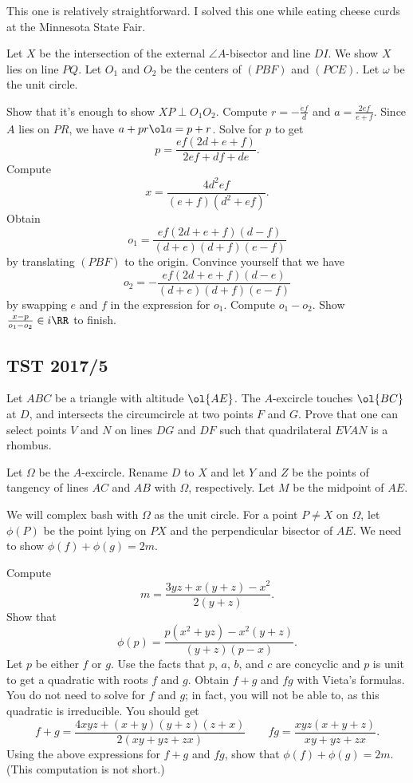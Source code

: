 \documentclass[11pt]{scrartcl}
\begin{document}
\begin{walkthrough}
	This one is relatively straightforward. I solved this one while eating cheese curds at the Minnesota State Fair.

	Let $X$ be the intersection of the external $\angle A$-bisector and line $DI$. We show $X$ lies on line $PQ$. Let $O_1$ and $O_2$ be the centers of $(PBF)$ and $(PCE)$. Let $\omega$ be the unit circle.
	\begin{walk}
		\ii Show that it's enough to show $XP \perp O_1O_2$.
		\ii Compute $r = -\frac{ef}d$ and $a = \frac{2ef}{e + f}$. Since $A$ lies on $PR$, we have $a + pr\ol a = p + r$. Solve for $p$ to get
		\[p = \frac{ef(2d + e + f)}{2ef + df + de}.\]
		\ii Compute
		\[x = \frac{4d^2ef}{(e + f)(d^2 + ef)}.\]
		\ii Obtain
		\[o_1 = \frac{ef(2d + e + f)(d - f)}{(d + e)(d + f)(e - f)}\]
		by translating $(PBF)$ to the origin.
		\ii Convince yourself that we have
		\[o_2 = -\frac{ef(2d + e + f)(d - e)}{(d + e)(d + f)(e - f)}\]
		by swapping $e$ and $f$ in the expression for $o_1$. Compute $o_1 - o_2$.
		\ii Show $\frac{x - p}{o_1 - o_2} \in i\RR$ to finish.
	\end{walk}
\end{walkthrough}

\pagebreak

\subsection{TST 2017/5}

\begin{example}[TST 2017/5]
	Let $ABC$ be a triangle with altitude $\ol{AE}$. The $A$-excircle touches $\ol{BC}$ at $D$, and intersects the circumcircle at two points $F$ and $G$. Prove that one can select points $V$ and $N$ on lines $DG$ and $DF$ such that quadrilateral $EVAN$ is a rhombus.
\end{example}

\begin{walkthrough}
	Let $\Omega$ be the $A$-excircle. Rename $D$ to $X$ and let $Y$ and $Z$ be the points of tangency of lines $AC$ and $AB$ with $\Omega$, respectively. Let $M$ be the midpoint of $AE$.

	We will complex bash with $\Omega$ as the unit circle. For a point $P \neq X$ on $\Omega$, let $\phi(P)$ be the point lying on $PX$ and the perpendicular bisector of $AE$. We need to show $\phi(f) + \phi(g) = 2m$.
	\begin{walk}
		\ii Compute
		\[m = \frac{3yz + x(y + z) - x^2}{2(y + z)}.\]
		\ii Show that
		\[\phi(p) = \frac{p(x^2 + yz) - x^2(y + z)}{(y + z)(p - x)}.\]
		\ii Let $p$ be either $f$ or $g$. Use the facts that $p$, $a$, $b$, and $c$ are concyclic and $p$ is unit to get a quadratic with roots $f$ and $g$. Obtain $f + g$ and $fg$ with Vieta's formulas. You do not need to solve for $f$ and $g$; in fact, you will not be able to, as this quadratic is irreducible. You should get
		\[f + g = \frac{4xyz + (x + y)(y + z)(z + x)}{2(xy + yz + zx)} \qquad fg = \frac{xyz(x + y + z)}{xy + yz + zx}.\]
		\ii Using the above expressions for $f + g$ and $fg$, show that $\phi(f) + \phi(g) = 2m$. (This computation is not short.)
	\end{walk}
\end{walkthrough}
\end{document}
